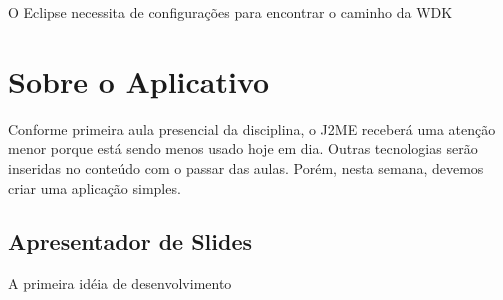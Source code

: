 \documentclass{article}
\begin{document}
O Eclipse necessita de configurações para encontrar o caminho da WDK

\section{Sobre o Aplicativo}
\label{sec:sobre}

Conforme primeira aula presencial da disciplina, o J2ME receberá uma atenção
menor porque está sendo menos usado hoje em dia. Outras tecnologias serão
inseridas no conteúdo com o passar das aulas. Porém, nesta semana, devemos criar
uma aplicação simples.

\subsection{Apresentador de Slides}

A primeira idéia de desenvolvimento 
\end{document}
